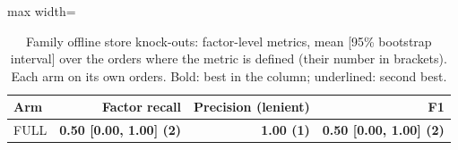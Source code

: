 \begin{table}[htbp]
\centering\footnotesize
\begin{adjustbox}{max width=\textwidth}
\begin{tabular}{@{}lrrr@{}}
\toprule
Arm & Factor recall & Precision (lenient) & F1 \\
\midrule
FULL & \textbf{0.50 [0.00, 1.00] (2)} & \textbf{1.00 (1)} & \textbf{0.50 [0.00, 1.00] (2)} \\
\bottomrule
\end{tabular}
\end{adjustbox}
\caption{Family offline store knock-outs: factor-level metrics, mean [95\% bootstrap interval] over the orders where the metric is defined (their number in brackets). Each arm on its own orders. Bold: best in the column; underlined: second best.}
\label{tab:table1a_shravani_off}
\end{table}